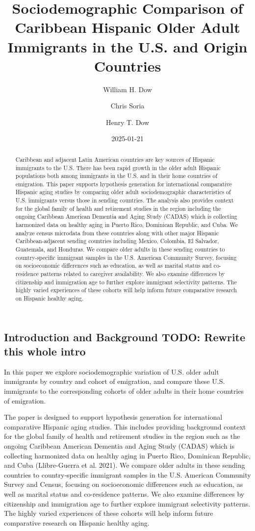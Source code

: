 \documentclass[
]{article}
\title{Sociodemographic Comparison of Caribbean Hispanic Older Adult
Immigrants in the U.S. and Origin Countries}
\author{William H. Dow \and Chris Soria \and Henry T. Dow}
\date{2025-01-21}
\begin{document}
\maketitle
\begin{abstract}
Caribbean and adjacent Latin American countries are key sources of
Hispanic immigrants to the U.S. There has been rapid growth in the older
adult Hispanic populations both among immigrants in the U.S. and in
their home countries of emigration. This paper supports hypothesis
generation for international comparative Hispanic aging studies by
comparing older adult sociodemographic characteristics of U.S.
immigrants versus those in sending countries. The analysis also provides
context for the global family of health and retirement studies in the
region including the ongoing Caribbean American Dementia and Aging Study
(CADAS) which is collecting harmonized data on healthy aging in Puerto
Rico, Dominican Republic, and Cuba. We analyze census microdata from
these countries along with other major Hispanic Caribbean-adjacent
sending countries including Mexico, Colombia, El Salvador, Guatemala,
and Honduras. We compare older adults in these sending countries to
country-specific immigrant samples in the U.S. American Community
Survey, focusing on socioeconomic differences such as education, as well
as marital status and co-residence patterns related to caregiver
availability. We also examine differences by citizenship and immigration
age to further explore immigrant selectivity patterns. The highly varied
experiences of these cohorts will help inform future comparative
research on Hispanic healthy aging.
\end{abstract}


\subsection{\texorpdfstring{Introduction and Background \textbf{TODO:}
Rewrite this whole
intro}{Introduction and Background TODO: Rewrite this whole intro}}\label{sec-intro}

In this paper we explore sociodemographic variation of U.S. older adult
immigrants by country and cohort of emigration, and compare these U.S.
immigrants to the corresponding cohorts of older adults in their home
countries of emigration.

The paper is designed to support hypothesis generation for international
comparative Hispanic aging studies. This includes providing background
context for the global family of health and retirement studies in the
region such as the ongoing Caribbean American Dementia and Aging Study
(CADAS) which is collecting harmonized data on healthy aging in Puerto
Rico, Dominican Republic, and Cuba (Llibre-Guerra et al. 2021). We
compare older adults in these sending countries to country-specific
immigrant samples in the U.S. American Community Survey and Census,
focusing on socioeconomic differences such as education, as well as
marital status and co-residence patterns. We also examine differences by
citizenship and immigration age to further explore immigrant selectivity
patterns. The highly varied experiences of these cohorts will help
inform future comparative research on Hispanic healthy aging.
\end{document}
